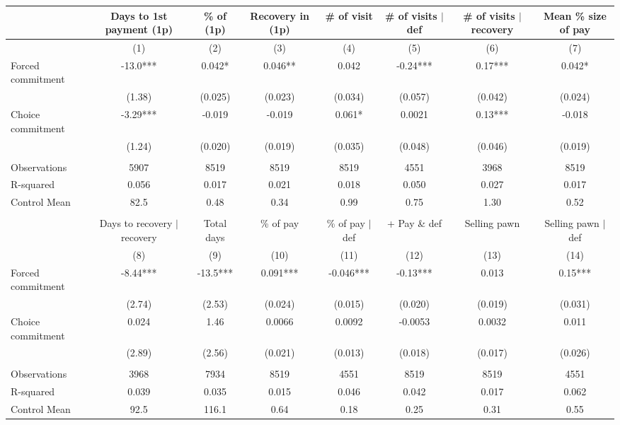 \begin{tabular}{lccccccc}
\toprule
      & Days to 1st payment (1p) & \% of (1p) & Recovery in (1p) & \# of visit & \# of visits $|$ def & \# of visits $|$ recovery & Mean \% size of pay \\
\midrule
\midrule
      & (1)   & (2)   & (3)   & (4)   & (5)   & (6)   & (7) \\
\midrule
\midrule
Forced commitment & -13.0*** & 0.042* & 0.046** & 0.042 & -0.24*** & 0.17*** & 0.042* \\
      & (1.38) & (0.025) & (0.023) & (0.034) & (0.057) & (0.042) & (0.024) \\
Choice commitment & -3.29*** & -0.019 & -0.019 & 0.061* & 0.0021 & 0.13*** & -0.018 \\
      & (1.24) & (0.020) & (0.019) & (0.035) & (0.048) & (0.046) & (0.019) \\
      &       &       &       &       &       &       &  \\
\midrule
Observations & 5907  & 8519  & 8519  & 8519  & 4551  & 3968  & 8519 \\
R-squared & 0.056 & 0.017 & 0.021 & 0.018 & 0.050 & 0.027 & 0.017 \\
Control Mean & 82.5  & 0.48  & 0.34  & 0.99  & 0.75  & 1.30  & 0.52 \\
\midrule
\midrule
      &       &       &       &       &       &       &  \\
\midrule
      & Days to recovery $|$ recovery & Total days & \% of pay & \% of pay $|$ def  & + Pay \& def & Selling pawn & Selling pawn $|$ def \\
\midrule
\midrule
      & (8)   & (9)   & (10)  & (11)  & (12)  & (13)  & (14) \\
\midrule
\midrule
Forced commitment & -8.44*** & -13.5*** & 0.091*** & -0.046*** & -0.13*** & 0.013 & 0.15*** \\
      & (2.74) & (2.53) & (0.024) & (0.015) & (0.020) & (0.019) & (0.031) \\
Choice commitment & 0.024 & 1.46  & 0.0066 & 0.0092 & -0.0053 & 0.0032 & 0.011 \\
      & (2.89) & (2.56) & (0.021) & (0.013) & (0.018) & (0.017) & (0.026) \\
      &       &       &       &       &       &       &  \\
\midrule
Observations & 3968  & 7934  & 8519  & 4551  & 8519  & 8519  & 4551 \\
R-squared & 0.039 & 0.035 & 0.015 & 0.046 & 0.042 & 0.017 & 0.062 \\
Control Mean & 92.5  & 116.1 & 0.64  & 0.18  & 0.25  & 0.31  & 0.55 \\
\bottomrule
\bottomrule
\end{tabular}%
